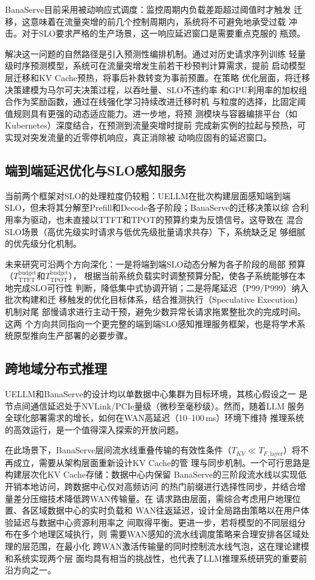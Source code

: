 BanaServe目前采用被动响应式调度：监控周期内负载差距超过阈值时才触发
迁移，这意味着在流量突增的前几个控制周期内，系统将不可避免地承受过载
冲击。对于SLO要求严格的生产场景，这一响应延迟窗口是需要重点克服的
瓶颈。

解决这一问题的自然路径是引入预测性编排机制。通过对历史请求序列训练
轻量级时序预测模型，系统可在流量突增发生前若干秒预判计算需求，提前
启动模型层迁移和KV Cache预热，将事后补救转变为事前预置。在策略
优化层面，将迁移决策建模为马尔可夫决策过程，以吞吐量、SLO不违约率
和GPU利用率的加权组合作为奖励函数，通过在线强化学习持续改进迁移时机
与粒度的选择，比固定阈值规则具有更强的动态适应能力。进一步地，将预
测模块与容器编排平台（如Kubernetes）深度结合，在预测到流量突增时提前
完成新实例的拉起与预热，可实现对突发流量的近零停机响应，真正消除被
动响应固有的延迟窗口。

\subsection{端到端延迟优化与SLO感知服务}

当前两个框架对SLO的处理粒度仍较粗：UELLM在批次构建层面感知端到端
SLO，但未将其分解至Prefill和Decode各子阶段；BanaServe的迁移决策以综
合利用率为驱动，也未直接以TTFT和TPOT的预算约束为反馈信号。这导致在
混合SLO场景（高优先级实时请求与低优先级批量请求共存）下，系统缺乏足
够细腻的优先级分化机制。

未来研究可沿两个方向深化：一是将端到端SLO动态分解为各子阶段的局部
预算（$T^{\text{budget}}_{\text{TTFT}}$和$T^{\text{budget}}_{\text{TPOT}}$），
根据当前系统负载实时调整预算分配，使各子系统能够在本地完成SLO可行性
判断，降低集中式协调开销；二是将尾延迟（P99/P999）纳入批次构建和迁
移触发的优化目标体系，结合推测执行（Speculative Execution）机制对尾
部慢请求进行主动干预，避免少数异常长请求拖累整批次的完成时间。这两
个方向共同指向一个更完整的端到端SLO感知推理服务框架，也是将学术系
统原型推向生产部署的必要步骤。

\subsection{跨地域分布式推理}

UELLM和BanaServe的设计均以单数据中心集群为目标环境，其核心假设之一
是节点间通信延迟处于NVLink/PCIe量级（微秒至毫秒级）。然而，随着LLM
服务全球化部署需求的增长，如何在WAN高延迟（10--100\,ms）环境下维持
推理系统的高效运行，是一个值得深入探索的开放问题。

在此场景下，BanaServe层间流水线重叠传输的有效性条件（$T_{KV} \ll
T_{F,\text{layer}}$）将不再成立，需要从架构层面重新设计KV Cache的管
理与同步机制。一个可行思路是构建层次化KV Cache存储：数据中心内保留
BanaServe的三阶段流水线以实现低开销本地访问，跨数据中心仅对高频访问
的热门前缀进行选择性同步，并结合增量差分压缩技术降低跨WAN传输量。在
请求路由层面，需综合考虑用户地理位置、各区域数据中心的实时负载和
WAN往返延迟，设计全局路由策略以在用户体验延迟与数据中心资源利用率之
间取得平衡。更进一步，若将模型的不同层组分布在多个地理区域执行，则
需要WAN感知的流水线调度策略来合理安排各区域处理的层范围，在最小化
跨WAN激活传输量的同时控制流水线气泡，这在理论建模和系统实现两个层
面均具有相当的挑战性，也代表了LLM推理系统研究的重要前沿方向之一。